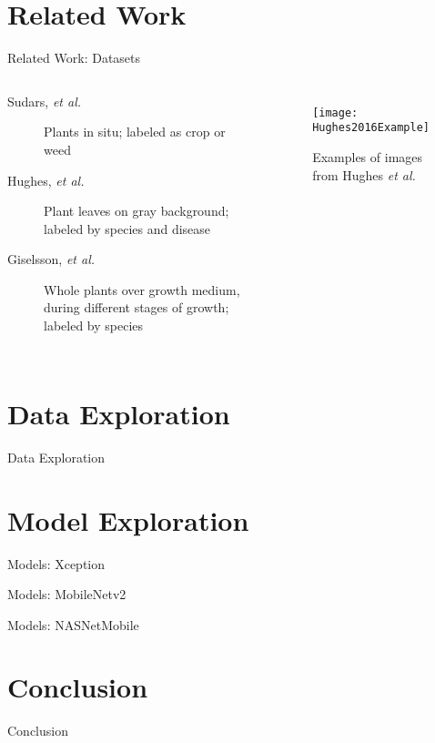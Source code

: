 \documentclass{beamer}
\begin{document}
\section[RW]{Related Work}

\begin{frame}{Related Work: Datasets}
	\begin{columns}
		\begin{description}
			\item[Sudars, \emph{et al.}] Plants in situ; labeled as crop or weed
			\item[Hughes, \emph{et al.}] Plant leaves on gray background; 
				labeled by species and disease
			\item[Giselsson, \emph{et al.}] Whole plants over growth medium, 
				during different stages of growth;
				labeled by species
		\end{description}
		\begin{figure}
			\begin{center}
				\texttt{[image: Hughes2016Example]}
			\end{center}
			\caption{Examples of images from Hughes \emph{et al.}}
		\end{figure}
	\end{columns}
\end{frame}

\section[Data]{Data Exploration}

\begin{frame}{Data Exploration}

\end{frame}

\section[Models]{Model Exploration}

\begin{frame}{Models: Xception}

\end{frame}

\begin{frame}{Models: MobileNetv2}

\end{frame}

\begin{frame}{Models: NASNetMobile}

\end{frame}

\section[Conclusion]{Conclusion}
\begin{frame}{Conclusion}

\end{frame}
\end{document}
